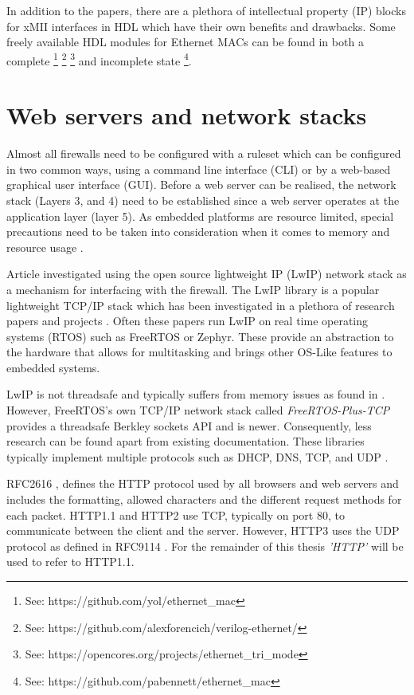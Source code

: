 In addition to the papers, there are a plethora of intellectual property (IP) blocks for xMII interfaces in HDL 
which have their own benefits and drawbacks. Some freely available HDL modules for Ethernet MACs can be found in both a complete \footnote[1]{See: https://github.com/yol/ethernet\_mac} \footnote[2]{See: https://github.com/alexforencich/verilog-ethernet/} 
\footnote[3]{See: https://opencores.org/projects/ethernet\_tri\_mode} and incomplete state
\footnote[4]{See: https://github.com/pabennett/ethernet\_mac}.








\section{Web servers and network stacks}



Almost all firewalls need to be configured with a ruleset which can be configured in two common ways, using a command line interface (CLI) 
or by a web-based graphical user interface (GUI). Before a web server can be realised, the network stack (Layers 3, and 4) need to be established since a web server operates at the application layer (layer 5). As embedded platforms are resource limited, special precautions need to be taken into consideration when it comes to memory and resource usage \cite{OptimCortexLwIP}.

Article \cite{LwIPFPGAFirewall} investigated using the open source lightweight IP (LwIP) network stack as a mechanism for interfacing with the firewall. 
The LwIP library is a popular lightweight TCP/IP stack which has been investigated in a plethora of research papers and projects \cite{ImprovemntOptimLWIP} 
\cite{OptimCortexLwIP}. Often these papers run LwIP on real time operating systems (RTOS) such as FreeRTOS or Zephyr. These provide an abstraction to the hardware that allows for multitasking and brings other OS-Like features to embedded systems. 

LwIP is not threadsafe and typically suffers from memory issues as found in \cite{OptimCortexLwIP}. However, FreeRTOS's own TCP/IP network stack called \textit{FreeRTOS-Plus-TCP} provides a threadsafe Berkley sockets API and is newer. Consequently, less research can be found apart from existing documentation. These libraries typically implement multiple protocols such as DHCP, DNS, TCP, and UDP \cite{FreeRTOSTCP}.

RFC2616 \cite{rfc2616}, defines the HTTP protocol used by all browsers and web servers and includes the formatting, allowed characters and the different request methods for each packet. HTTP1.1 and HTTP2 use TCP, typically on port 80, to communicate between the client and the server. However, HTTP3 uses the UDP protocol as defined in RFC9114 \cite{rfc9114}. For the remainder of this thesis \textit{'HTTP'} will be used to refer to HTTP1.1.

